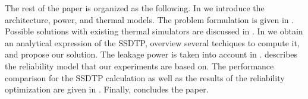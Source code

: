 The rest of the paper is organized as the following. In  we introduce the architecture, power, and thermal models. The problem formulation is given in . Possible solutions with existing thermal simulators are discussed in . In  we obtain an analytical expression of the SSDTP, overview several techiques to compute it, and propose our solution. The leakage power is taken into account in .  describes the reliability model that our experiments are based on. The performance comparison for the SSDTP calculation as well as the results of the reliability optimization are given in . Finally,  concludes the paper.
